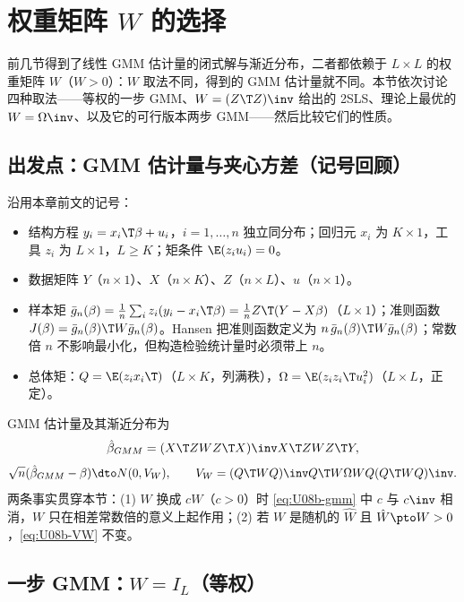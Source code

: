 \section{权重矩阵 \texorpdfstring{$W$}{W} 的选择}\label{sec:U08b-W}

前几节得到了线性 GMM 估计量的闭式解与渐近分布，二者都依赖于 $L\times L$ 的权重矩阵 $W$（$W>0$）：$W$ 取法不同，得到的 GMM 估计量就不同。本节依次讨论四种取法——等权的一步 GMM、$W=(Z\T Z)\inv$ 给出的 2SLS、理论上最优的 $W=\Omega\inv$、以及它的可行版本两步 GMM——然后比较它们的性质。

\subsection{出发点：GMM 估计量与夹心方差（记号回顾）}

沿用本章前文的记号：
\begin{itemize}
  \item 结构方程 $y_i=x_i\T\beta+u_i$，$i=1,\dots,n$ 独立同分布；回归元 $x_i$ 为 $K\times1$，工具 $z_i$ 为 $L\times1$，$L\ge K$；矩条件 $\E(z_iu_i)=0$。
  \item 数据矩阵 $Y$（$n\times1$）、$X$（$n\times K$）、$Z$（$n\times L$）、$u$（$n\times1$）。
  \item 样本矩 $\bar g_n(\beta)=\frac1n\sum_i z_i(y_i-x_i\T\beta)=\frac1nZ\T(Y-X\beta)$（$L\times1$）；准则函数 $J(\beta)=\bar g_n(\beta)\T W\bar g_n(\beta)$。Hansen 把准则函数定义为 $n\,\bar g_n(\beta)\T W\bar g_n(\beta)$；常数倍 $n$ 不影响最小化，但构造检验统计量时必须带上 $n$。
  \item 总体矩：$Q=\E(z_ix_i\T)$（$L\times K$，列满秩），$\Omega=\E(z_iz_i\T u_i^2)$（$L\times L$，正定）。
\end{itemize}
GMM 估计量及其渐近分布为
\begin{equation}\label{eq:U08b-gmm}
\hat\beta_{GMM}=(X\T ZWZ\T X)\inv X\T ZWZ\T Y ,
\end{equation}
\begin{equation}\label{eq:U08b-VW}
\sqrt n(\hat\beta_{GMM}-\beta)\dto N(0,V_W),\qquad V_W=(Q\T WQ)\inv Q\T W\Omega WQ(Q\T WQ)\inv .
\end{equation}
两条事实贯穿本节：(1) $W$ 换成 $cW$（$c>0$）时 \eqref{eq:U08b-gmm} 中 $c$ 与 $c\inv$ 相消，$W$ 只在相差常数倍的意义上起作用；(2) 若 $W$ 是随机的 $\hat W$ 且 $\hat W\pto W>0$，\eqref{eq:U08b-VW} 不变。

\subsection{一步 GMM：\texorpdfstring{$W=I_L$}{W = I}（等权）}\label{sec:U08b-onestep}

